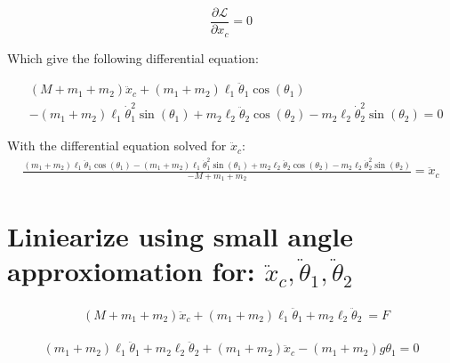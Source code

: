 \documentclass[10pt]{article}
\begin{document}
    
    \begin{equation} \label{eq: lagrange Step3}
        \frac{\partial \mathcal{L}}{\partial x_c} = 0
        \end{equation}

    Which give the following differential equation:

    \begin{equation}
        \begin{aligned}
            &(M + m_1 + m_2)\ddot x_c +  (m_1 + m_2)\ell_1\ddot\theta_1\cos(\theta_1)\\
            &- (m_1 + m_2)\ell_1\dot\theta_1^2\sin(\theta_1) + m_2\ell_2\ddot\theta_2\cos(\theta_2) - m_2\ell_2\dot\theta_2^2\sin(\theta_2)  = 0      
        \end{aligned}
    \end{equation}   

    With the differential equation solved for $\ddot x_c$:
    \begin{equation}
        \begin{aligned}
            \frac{(m_1 + m_2)\ell_1\ddot\theta_1\cos(\theta_1) - (m_1 + m_2)\ell_1\dot\theta_1^2\sin(\theta_1) + m_2\ell_2\ddot\theta_2\cos(\theta_2) - m_2\ell_2\dot\theta_2^2\sin(\theta_2)}{-M+m_1+m_2} = \ddot x_c
        \end{aligned}
    \end{equation}  




    \pagebreak
    \section{Liniearize using small angle approxiomation for: $\ddot x_c, \ddot \theta_1, \ddot \theta_2$}

    \begin{equation}
        \begin{aligned}
            &(M+m_1+m_2)\ddot x_c + (m_1+m_2)\ell_1\ddot\theta_1 + m_2\ell_2\ddot\theta_2\    = F
        \end{aligned}   
    \end{equation}

    \begin{equation}
        \begin{aligned}
            (m_1 + m_2)\ell_1\ddot \theta_1 + m_2\ell_2\ddot\theta_2
            +   (m_1 +m_2)\ddot x_c - (m_1 + m_2)g\theta_1 = 0 
        \end{aligned}   
    \end{equation}
\end{document}

